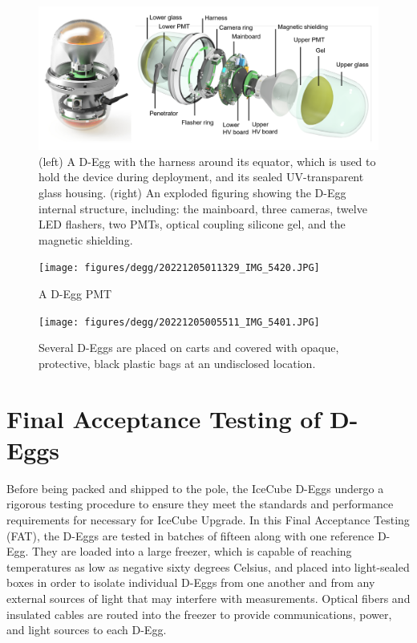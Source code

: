 \documentclass[main.tex]{subfiles}
\begin{document}
\begin{figure}
    \centering
    \includegraphics[width=\linewidth]{figures/degg.png}
    \caption{(left) A D-Egg with the harness around its equator, which is used to hold the device during deployment, and its sealed UV-transparent glass housing. (right) An exploded figuring showing the D-Egg internal structure, including: the mainboard, three cameras, twelve LED flashers, two PMTs, optical coupling silicone gel, and the magnetic shielding.}\label{fig:degg}
\end{figure}

\begin{figure}
    \centering
    \texttt{[image: figures/degg/20221205011329\_IMG\_5420.JPG]}
    \caption{A D-Egg PMT}
\end{figure}

\begin{figure}
    \centering
    \texttt{[image: figures/degg/20221205005511\_IMG\_5401.JPG]}
    \caption{Several D-Eggs are placed on carts and covered with opaque, protective, black plastic bags at an undisclosed location.}\label{fig:degg_bag}
\end{figure}


\section{Final Acceptance Testing of D-Eggs}

Before being packed and shipped to the pole, the IceCube D-Eggs undergo a rigorous testing procedure to ensure they meet the standards and performance requirements for necessary for IceCube Upgrade.
In this Final Acceptance Testing (FAT), the D-Eggs are tested in batches of fifteen along with one reference D-Egg. 
They are loaded into a large freezer, which is capable of reaching temperatures as low as negative sixty degrees Celsius, and placed into light-sealed boxes in order to isolate individual D-Eggs from one another and from any external sources of light that may interfere with measurements.
Optical fibers and insulated cables are routed into the freezer to provide communications, power, and light sources to each D-Egg. 
\end{document}
